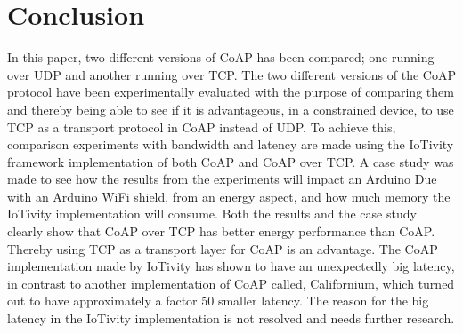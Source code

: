 \section{Conclusion}\label{sec:conclusion}
In this paper, two different versions of CoAP has been compared; one running over UDP and another running over TCP. The two different versions of the CoAP protocol have been experimentally evaluated with the purpose of comparing them and thereby being able to see if it is advantageous, in a constrained device, to use TCP as a transport protocol in CoAP instead of UDP. 
To achieve this, comparison experiments with bandwidth and latency are made using the IoTivity framework implementation of both CoAP and CoAP over TCP. A case study was made to see how the results from the experiments will impact an Arduino Due with an Arduino WiFi shield, from an energy aspect, and how much memory the IoTivity implementation will consume. 
Both the results and the case study clearly show that CoAP over TCP has better energy performance than CoAP. 
Thereby using TCP as a transport layer for CoAP is an advantage. 
The CoAP implementation made by IoTivity has shown to have an unexpectedly big latency, in contrast to another implementation of CoAP called, Californium, which turned out to have approximately a factor 50 smaller latency. The reason for the big latency in the IoTivity implementation is not resolved and needs further research.  




